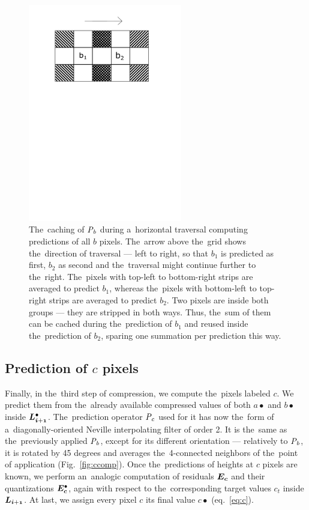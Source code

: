 \begin{figure}
	\includegraphics[trim={0 19cm 0cm 1cm}, clip, width=0.6\textwidth]{figures/bcaching.pdf}\centering
	\caption{The~caching of $\mathit{P_{b}}$ during a~horizontal traversal computing predictions of all $b$ pixels. The~arrow above the~grid shows the~direction of traversal --- left to right, so that $b_1$ is predicted as first, $b_2$ as second and the~traversal might continue further to the~right. The~pixels with top-left to bottom-right strips are averaged to predict $b_1$, whereas the~pixels with bottom-left to top-right strips are averaged to predict $b_2$. Two pixels are inside both groups --- they are stripped in both ways. Thus, the~sum of them can be cached during the~prediction of $b_1$ and reused inside the~prediction of $b_2$, sparing one summation per prediction this way.}
	\label{fig:bcaching}
\end{figure}

\subsection*{Prediction of $c$ pixels}

Finally, in the~third step of compression, we compute the~pixels labeled $c$. We predict them from the~already available compressed values of both $a\bullet$ and $b\bullet$ inside $\ldot{i+1}$. The~prediction operator $\mathit{P_{c}}$ used for it has now the~form of a~diagonally-oriented Neville interpolating filter of order 2. It is the~same as the~previously applied $\mathit{P_{b}}$, except for its different orientation --- relatively to $\mathit{P_{b}}$, it is rotated by 45 degrees and averages the~4-connected neighbors of the~point of application (Fig.~\ref{fig:ccomp}). Once the~predictions of heights at $c$ pixels are known, we perform an~analogic computation of residuals $\objnorm{E}{c}$ and their quantizations $\objdot{E}{c}$, again with respect to the~corresponding target values $c_t$ inside $\lnorm{i+1}$. At last, we assign every pixel $c$ its final value $c\bullet$ (eq.~\ref{eq:c}).

